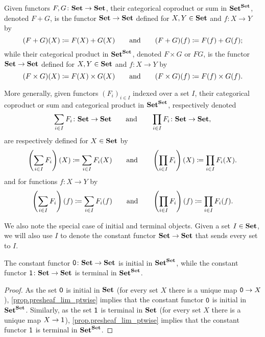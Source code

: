 \documentclass[Book-Poly]{subfiles}
\begin{document}
\begin{corollary} \label{cor.sum_prod_set_endofuncs}
    Given functors $F,G\colon\mathbf{Set}\to\mathbf{Set}$, their categorical coproduct or sum in $\mathbf{Set}^{\mathbf{Set}}$, denoted $F+G$, is the functor $\mathbf{Set}\to\mathbf{Set}$ defined for $X,Y\in\mathbf{Set}$ and $f\colon X\to Y$ by
    \[
    (F+G)(X)\coloneqq F(X)+G(X) \qquad\text{and}\qquad (F+G)(f)\coloneqq F(f)+G(f);
    \]
    while their categorical product in $\mathbf{Set}^{\mathbf{Set}}$, denoted $F\times G$ or $FG$, is the functor $\mathbf{Set}\to\mathbf{Set}$ defined for $X,Y\in\mathbf{Set}$ and $f\colon X\to Y$ by
    \[
    (F\times G)(X)\coloneqq F(X)\times G(X) \qquad\text{and}\qquad (F\times G)(f)\coloneqq F(f)\times G(f).
    \]

    More generally, given functors $(F_i)_{i\in I}$ indexed over a set $I$, their categorical coproduct or sum and categorical product in $\mathbf{Set}^{\mathbf{Set}}$, respectively denoted
    \[
    \sum_{i\in I}F_i\colon\mathbf{Set}\to\mathbf{Set}
    \qquad\text{and}\qquad
    \prod_{i\in I}F_i\colon\mathbf{Set}\to\mathbf{Set},
    \]
    are respectively defined for $X\in\mathbf{Set}$ by
    \[
    \left(\sum_{i\in I}F_i\right)(X)\coloneqq\sum_{i\in I} F_i(X)
    \qquad\text{and}\qquad
    \left(\prod_{i\in I}F_i\right)(X)\coloneqq\prod_{i\in I} F_i(X).
    \]
    and for functions $f\colon X\to Y$ by
    \[
    \left(\sum_{i\in I}F_i\right)(f)\coloneqq\sum_{i\in I} F_i(f)
    \qquad\text{and}\qquad
    \left(\prod_{i\in I}F_i\right)(f)\coloneqq\prod_{i\in I} F_i(f).
    \]
\end{corollary}


We also note the special case of initial and terminal objects.
Given a set $I\in\mathbf{Set}$, we will also use $I$ to denote the constant functor $\mathbf{Set}\to\mathbf{Set}$ that sends every set to $I$.

\begin{corollary}
    The constant functor $\textsf{0}\colon\mathbf{Set}\to\mathbf{Set}$ is initial in $\mathbf{Set}^{\mathbf{Set}}$, while the constant functor $\textsf{1}\colon\mathbf{Set}\to\mathbf{Set}$ is terminal in $\mathbf{Set}^{\mathbf{Set}}$.
\end{corollary}
\begin{proof}
    As the set $\textsf{0}$ is initial in $\mathbf{Set}$ (for every set $X$ there is a unique map $\textsf{0}\to X$), \cref{prop.presheaf_lim_ptwise} implies that the constant functor $\textsf{0}$ is initial in $\mathbf{Set}^{\mathbf{Set}}$.
    Similarly, as the set $\textsf{1}$ is terminal in $\mathbf{Set}$ (for every set $X$ there is a unique map $X\to\textsf{1}$), \cref{prop.presheaf_lim_ptwise} implies that the constant functor $\textsf{1}$ is terminal in $\mathbf{Set}^{\mathbf{Set}}$.
\end{proof}
\end{document}

